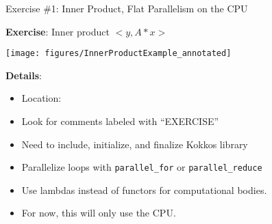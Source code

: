 

\begin{frame}[fragile]{Exercise \#1: Inner Product, Flat Parallelism on the CPU}

  \vspace{5pt}

  \textbf{Exercise}: Inner product $<y, A * x>$

  \vspace{-10pt}

  \begin{center}
    \texttt{[image: figures/InnerProductExample\_annotated]}
  \end{center}

  \vspace{-30pt}

  \textbf{Details}:
  \begin{small}
  \begin{itemize}
\item Location: 
\item Look for comments labeled with ``EXERCISE''
\item Need to include, initialize, and finalize Kokkos library
\item Parallelize loops with \texttt{parallel\_for} or \texttt{parallel\_reduce}
\item Use lambdas instead of functors for computational bodies.
\item For now, this will only use the CPU.
\end{itemize}
  \end{small}

\end{frame}


